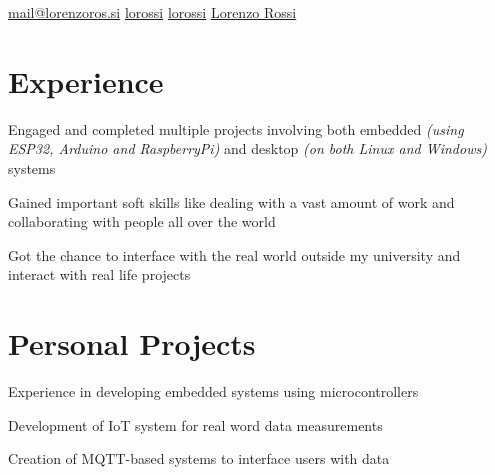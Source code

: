 \documentclass[]{plushcv}
\begin{document}
%
%

{
  {\href{mailto:mail@lorenzoros.si}{mail@lorenzoros.si}}
  {\href{https://www.github.com/lorossi}{lorossi}}
  {\href{https://www.instagram.com/lorossi/}{lorossi}}
  {\href{https://www.linkedin.com/in/lorenzo-rossi-897628212/}{Lorenzo Rossi}}
}

%
%

\begin{minipage}[t]{0.60\textwidth}



  \section{Experience}
  \vspace{\topsep} %
  \begin{tightemize}
    \sectionsep
    \item Engaged and completed multiple projects involving both embedded \textit{(using ESP32, Arduino and RaspberryPi)} and desktop \textit{(on both Linux and Windows)} systems
    \item Gained important soft skills like dealing with a vast amount of work and collaborating with people all over the world
    \item Got the chance to interface with the real world outside my university and interact with real life projects
  \end{tightemize}
  \sectionsep


  \section{Personal Projects}

  \begin{tightemize}
    \item Experience in developing embedded systems using microcontrollers
    \item Development of IoT system for real word data measurements
    \item Creation of MQTT-based systems to interface users with data
  \end{tightemize}
  \sectionsep


\end{minipage}
\end{document}
